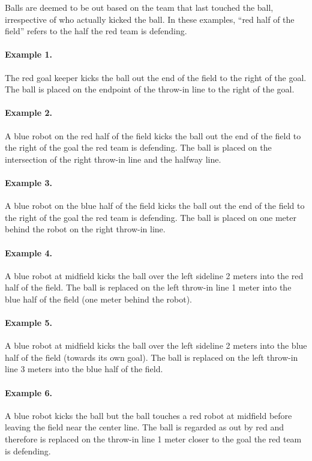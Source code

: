 \documentclass[12pt]{article}
\begin{document}
Balls are deemed to be out based on the team that last touched the ball, irrespective of who actually kicked the ball.  In these examples, ``red half of the field'' refers to the half the red team is defending.

\paragraph{Example 1.} The red goal keeper kicks the ball out the end of the field to the right of the goal. The ball is placed on the endpoint of the throw-in line to the right of the goal.

\paragraph{Example 2.} A blue robot on the red half of the field kicks the ball out the end of the field to the right of the goal the red team is defending. The ball is placed on the intersection of the right throw-in line and the halfway line.

\paragraph{Example 3.} A blue robot on the blue half of the field kicks the ball out the end of the field to the right of the goal the red team is defending. The ball is placed on one meter behind the robot on the right throw-in line.

\paragraph{Example 4.} A blue robot at midfield kicks the ball over the left sideline 2 meters into the red half of the field. The ball is replaced on the left throw-in line 1 meter into the blue half of the field (one meter behind the robot).

\paragraph{Example 5.} A blue robot at midfield kicks the ball over the left sideline 2 meters into the blue half of the field (towards its own goal). The ball is replaced on the left throw-in line 3 meters into the blue half of the field.

\paragraph{Example 6.} A blue robot kicks the ball but the ball touches a red robot at midfield before leaving the field near the center line. The ball is regarded as out by red and therefore is replaced on the throw-in line 1 meter closer to the goal the red team is defending.
\end{document}
